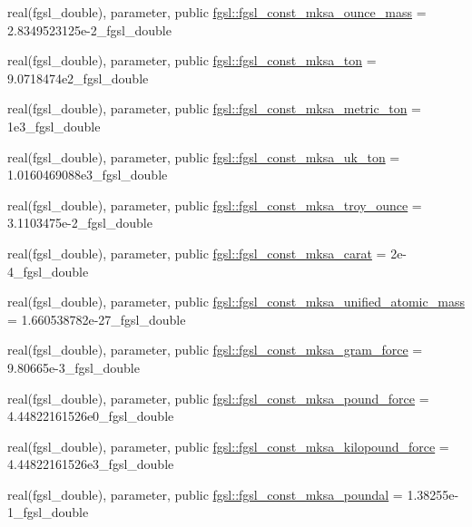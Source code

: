 \begin{DoxyCompactItemize}
\item 
real(fgsl\+\_\+double), parameter, public \hyperlink{namespacefgsl_ad41b90538ca94b0ba552ed733d732c4b}{fgsl\+::fgsl\+\_\+const\+\_\+mksa\+\_\+ounce\+\_\+mass} = 2.\+8349523125e-\/2\+\_\+fgsl\+\_\+double
\item 
real(fgsl\+\_\+double), parameter, public \hyperlink{namespacefgsl_a28b9223526d6d5565fda3d778045fee0}{fgsl\+::fgsl\+\_\+const\+\_\+mksa\+\_\+ton} = 9.\+0718474e2\+\_\+fgsl\+\_\+double
\item 
real(fgsl\+\_\+double), parameter, public \hyperlink{namespacefgsl_a0d771fd3ef9d093957328b9555c6a604}{fgsl\+::fgsl\+\_\+const\+\_\+mksa\+\_\+metric\+\_\+ton} = 1e3\+\_\+fgsl\+\_\+double
\item 
real(fgsl\+\_\+double), parameter, public \hyperlink{namespacefgsl_a3eea842ca98526b2c06b85da367b7579}{fgsl\+::fgsl\+\_\+const\+\_\+mksa\+\_\+uk\+\_\+ton} = 1.\+0160469088e3\+\_\+fgsl\+\_\+double
\item 
real(fgsl\+\_\+double), parameter, public \hyperlink{namespacefgsl_a7046241db07bad6371b685e812c9d177}{fgsl\+::fgsl\+\_\+const\+\_\+mksa\+\_\+troy\+\_\+ounce} = 3.\+1103475e-\/2\+\_\+fgsl\+\_\+double
\item 
real(fgsl\+\_\+double), parameter, public \hyperlink{namespacefgsl_ab0deb9fa34a456a2db1c8833499c5b2f}{fgsl\+::fgsl\+\_\+const\+\_\+mksa\+\_\+carat} = 2e-\/4\+\_\+fgsl\+\_\+double
\item 
real(fgsl\+\_\+double), parameter, public \hyperlink{namespacefgsl_a0e18a0c505ad7f70865f8d0351dbec24}{fgsl\+::fgsl\+\_\+const\+\_\+mksa\+\_\+unified\+\_\+atomic\+\_\+mass} = 1.\+660538782e-\/27\+\_\+fgsl\+\_\+double
\item 
real(fgsl\+\_\+double), parameter, public \hyperlink{namespacefgsl_ac3e7e21c6fe9874df8a9b7583e343e76}{fgsl\+::fgsl\+\_\+const\+\_\+mksa\+\_\+gram\+\_\+force} = 9.\+80665e-\/3\+\_\+fgsl\+\_\+double
\item 
real(fgsl\+\_\+double), parameter, public \hyperlink{namespacefgsl_af568f44c87cf706dcc1fe887c5a68604}{fgsl\+::fgsl\+\_\+const\+\_\+mksa\+\_\+pound\+\_\+force} = 4.\+44822161526e0\+\_\+fgsl\+\_\+double
\item 
real(fgsl\+\_\+double), parameter, public \hyperlink{namespacefgsl_a7c76b512b50dc8300612e051816e5ede}{fgsl\+::fgsl\+\_\+const\+\_\+mksa\+\_\+kilopound\+\_\+force} = 4.\+44822161526e3\+\_\+fgsl\+\_\+double
\item 
real(fgsl\+\_\+double), parameter, public \hyperlink{namespacefgsl_a6679d0f4bba1852ff847f920c8f8ad2b}{fgsl\+::fgsl\+\_\+const\+\_\+mksa\+\_\+poundal} = 1.\+38255e-\/1\+\_\+fgsl\+\_\+double

\end{DoxyCompactItemize}
